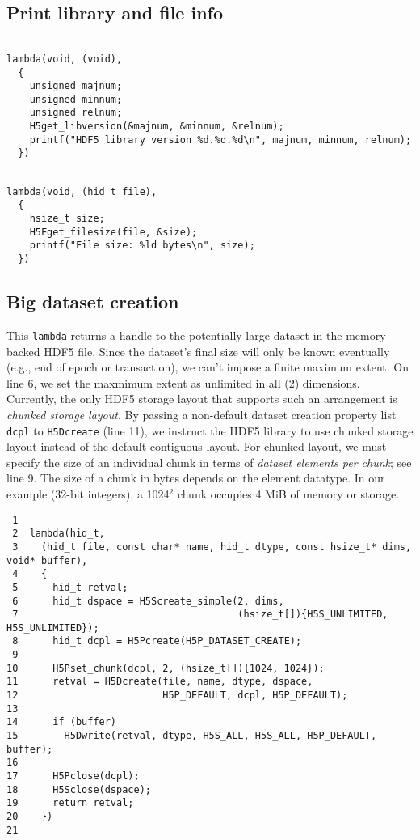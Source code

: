 \documentclass[a4paper, 12pt]{article}
\begin{document}
\subsection{Print library and file info}
\label{sec:org35ccb20}

\begin{verbatim}

lambda(void, (void),
  {
    unsigned majnum;
    unsigned minnum;
    unsigned relnum;
    H5get_libversion(&majnum, &minnum, &relnum);
    printf("HDF5 library version %d.%d.%d\n", majnum, minnum, relnum);
  })

\end{verbatim}

\begin{verbatim}

lambda(void, (hid_t file),
  {
    hsize_t size;
    H5Fget_filesize(file, &size);
    printf("File size: %ld bytes\n", size);
  })

\end{verbatim}

\subsection{Big dataset creation \label{org9d4b4ca}}
\label{sec:org4f4542a}

This \texttt{lambda} returns a handle to the potentially large dataset in the
memory-backed HDF5 file. Since the dataset's final size will only be known
eventually (e.g., end of epoch or transaction), we can't impose a finite
maximum extent. On line 6, we set the maxmimum extent as unlimited
in all (2) dimensions. Currently, the only HDF5 storage layout that supports
such an arrangement is \emph{chunked storage layout}. By passing a non-default
dataset creation property list \texttt{dcpl} to \texttt{H5Dcreate} (line 11), we
instruct the HDF5 library to use chunked storage layout instead of the
default contiguous layout. For chunked layout, we must specify the size of
an individual chunk in terms of \emph{dataset elements per chunk}; see line
9. The size of a chunk in bytes depends on the element datatype.
In our example (32-bit integers), a 1024\(^{\text{2}}\) chunk occupies 4 MiB of memory
or storage.

\begin{verbatim}
 1
 2  lambda(hid_t,
 3    (hid_t file, const char* name, hid_t dtype, const hsize_t* dims, void* buffer),
 4    {
 5      hid_t retval;
 6      hid_t dspace = H5Screate_simple(2, dims,
 7                                      (hsize_t[]){H5S_UNLIMITED, H5S_UNLIMITED});
 8      hid_t dcpl = H5Pcreate(H5P_DATASET_CREATE);
 9
10      H5Pset_chunk(dcpl, 2, (hsize_t[]){1024, 1024});
11      retval = H5Dcreate(file, name, dtype, dspace,
12                         H5P_DEFAULT, dcpl, H5P_DEFAULT);
13
14      if (buffer)
15        H5Dwrite(retval, dtype, H5S_ALL, H5S_ALL, H5P_DEFAULT, buffer);
16
17      H5Pclose(dcpl);
18      H5Sclose(dspace);
19      return retval;
20    })
21
\end{verbatim}
\end{document}
